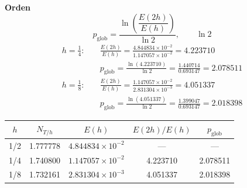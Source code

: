 \textbf{Orden}
\[
p_{\mathrm{glob}} = \frac{\ln\!\left(\dfrac{E(2h)}{E(h)}\right)}{\ln 2}, \qquad \ln 2 
\]
\begin{align*}
	h = \tfrac14:&\quad \frac{E(2h)}{E(h)} = \frac{4.844834\times10^{-2}}{1.147057\times10^{-2}} = 4.223710\\
	&\quad p_{\mathrm{glob}} = \frac{\ln(4.223710)}{\ln 2} = \frac{1.440714}{0.693147} = 2.078511\\[6pt]
	h = \tfrac18:&\quad \frac{E(2h)}{E(h)} = \frac{1.147057\times10^{-2}}{2.831304\times10^{-3}} = 4.051337\\
	&\quad p_{\mathrm{glob}} = \frac{\ln(4.051337)}{\ln 2} = \frac{1.399047}{0.693147} = 2.018398
\end{align*}
\begin{center}
	\begin{tabular}{ccccc}\toprule
		$h$ & $N_{T/h}$ & $E(h)$ & $E(2h)/E(h)$ & $p_{\mathrm{glob}}$\\\midrule
		1/2 & 1.777778 & $4.844834\times10^{-2}$ & ---      & ---      \\
		1/4 & 1.740800 & $1.147057\times10^{-2}$ & 4.223710 & 2.078511 \\
		1/8 & 1.732161 & $2.831304\times10^{-3}$ & 4.051337 & 2.018398 \\\bottomrule
	\end{tabular}
\end{center}

